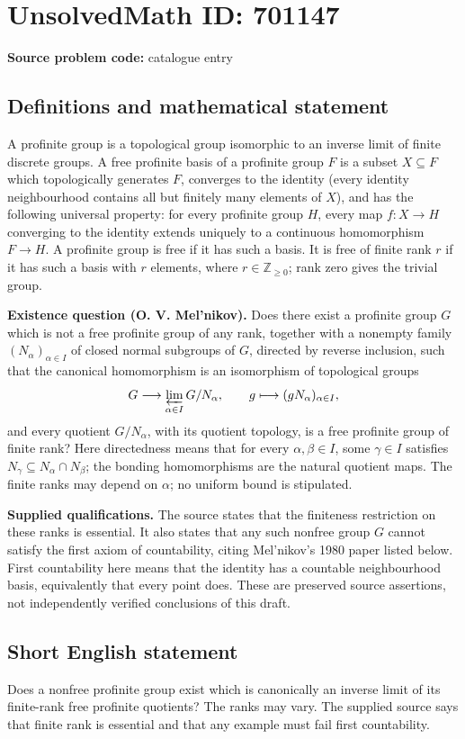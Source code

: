 \documentclass[11pt]{article}
\newcommand{\Z}{\mathbb{Z}}
\begin{document}
\section*{UnsolvedMath ID: 701147}
\textbf{Source problem code:} catalogue entry
\subsection{Definitions and mathematical statement}
A profinite group is a topological group isomorphic to an inverse limit of finite discrete groups. A free profinite basis of a profinite group \(F\) is a subset \(X\subseteq F\) which topologically generates \(F\), converges to the identity (every identity neighbourhood contains all but finitely many elements of \(X\)), and has the following universal property: for every profinite group \(H\), every map \(f:X\to H\) converging to the identity extends uniquely to a continuous homomorphism \(F\to H\). A profinite group is free if it has such a basis. It is free of finite rank \(r\) if it has such a basis with \(r\) elements, where \(r\in\Z_{\geq 0}\); rank zero gives the trivial group.

\textbf{Existence question (O. V. Mel'nikov).} Does there exist a profinite group \(G\) which is not a free profinite group of any rank, together with a nonempty family \((N_\alpha)_{\alpha\in I}\) of closed normal subgroups of \(G\), directed by reverse inclusion, such that the canonical homomorphism is an isomorphism of topological groups
\[
G\longrightarrow\varprojlim_{\alpha\in I}G/N_\alpha,
\qquad g\longmapsto(gN_\alpha)_{\alpha\in I},
\]
and every quotient \(G/N_\alpha\), with its quotient topology, is a free profinite group of finite rank? Here directedness means that for every \(\alpha,\beta\in I\), some \(\gamma\in I\) satisfies \(N_\gamma\subseteq N_\alpha\cap N_\beta\); the bonding homomorphisms are the natural quotient maps. The finite ranks may depend on \(\alpha\); no uniform bound is stipulated.

\textbf{Supplied qualifications.} The source states that the finiteness restriction on these ranks is essential. It also states that any such nonfree group \(G\) cannot satisfy the first axiom of countability, citing Mel'nikov's 1980 paper listed below. First countability here means that the identity has a countable neighbourhood basis, equivalently that every point does. These are preserved source assertions, not independently verified conclusions of this draft.
\subsection{Short English statement}
Does a nonfree profinite group exist which is canonically an inverse limit of its finite-rank free profinite quotients? The ranks may vary. The supplied source says that finite rank is essential and that any example must fail first countability.
\end{document}
